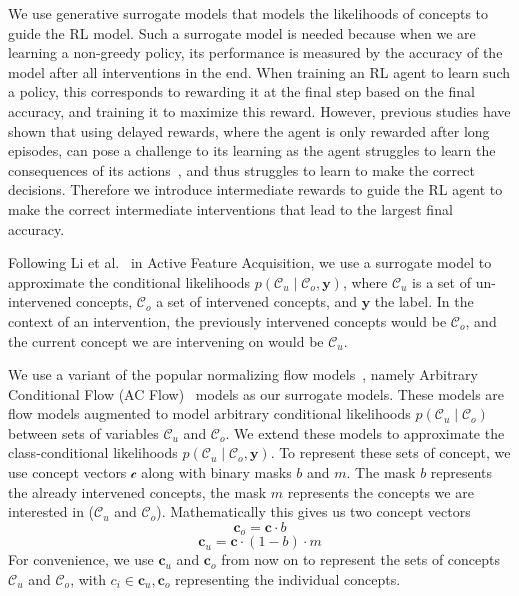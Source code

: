 We use generative surrogate models that models the likelihoods of concepts
to guide the RL model. 
Such a surrogate model is needed because
when we are learning
a non-greedy policy, its performance is measured by the accuracy
of the model after all interventions in the end.
When training an RL agent to learn such a policy, this corresponds
to rewarding it at the final step based 
on the final accuracy, and training it to maximize this reward.
However, previous studies have shown that
using delayed rewards, where the agent is only rewarded after long episodes,
can pose a challenge to its learning as the agent struggles to learn
the consequences of its actions~\cite{ steps-towards-ai, temporal-credit-assignment},
and thus struggles to learn to make the correct decisions.
Therefore we introduce intermediate rewards 
to guide the RL agent to make the correct intermediate
interventions that lead 
to the largest final accuracy.

Following Li et al.~\cite{afa} in Active Feature Acquisition,
we use a surrogate model 
to approximate
the conditional likelihoods $p(\mathcal{C}_u \mid \mathcal{C}_o, \mathbf{y})$, 
where $\mathcal{C}_u$ is a set of un-intervened
concepts, $\mathcal{C}_o$ a set of intervened concepts,
and $\mathbf{y}$ the label. 
In the context of an intervention, the previously intervened concepts would be $\mathcal{C}_o$,
and the current concept we are intervening on would be
$\mathcal{C}_u$.

We use a variant of the popular normalizing flow models~\cite{normalizing-flows},
namely Arbitrary Conditional Flow (AC Flow)~\cite{acflow}
models as our surrogate models.
These models are 
flow models augmented to model arbitrary conditional likelihoods $p(\mathcal{C}_u \mid \mathcal{C}_o)$
between sets of variables $\mathcal{C}_u$ and $\mathcal{C}_o$.
We extend these models to approximate the class-conditional
likelihoods
$p(\mathcal{C}_u \mid \mathcal{C}_o, \mathbf{y})$. To represent
these sets of concept,
we use concept vectors $\mathcal{c}$ along with
binary masks $b$ and $m$.
The mask $b$ represents
the already intervened concepts, the mask $m$ represents
the concepts we are interested in ($\mathcal{C}_u$ and $\mathcal{C}_o$).
Mathematically this gives us two concept vectors
\[\mathbf{c}_o = \mathbf{c} \cdot b\]
\[\mathbf{c}_u = \mathbf{c} \cdot (1 - b) \cdot m\]
For convenience, we use $\mathbf{c}_u$ and $\mathbf{c}_o$ from now on
to represent the sets of concepts $\mathcal{C}_u$ and $\mathcal{C}_o$, with
$c_i \in \mathbf{c}_u, \mathbf{c}_o$ representing the individual concepts.

